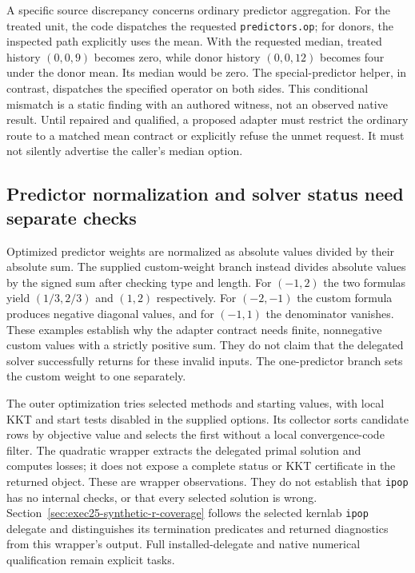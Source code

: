 A specific source discrepancy concerns ordinary predictor aggregation.
For the treated unit, the code dispatches the requested
\texttt{predictors.op}; for donors, the inspected path explicitly uses
the mean. With the requested median, treated history $(0,0,9)$ becomes
zero, while donor history $(0,0,12)$ becomes four under the donor mean.
Its median would be zero. The special-predictor helper, in contrast,
dispatches the specified operator on both sides. This conditional mismatch
is a static finding with an authored witness, not an observed native
result. Until repaired and qualified, a proposed adapter must restrict
the ordinary route to a matched mean contract or explicitly refuse the
unmet request. It must not silently advertise the caller's median option.
\citep{exec24_synth_source,exec24_synth_choice}

\subsection{Predictor normalization and solver status need separate checks}
Optimized predictor weights are normalized as absolute values divided by
their absolute sum. The supplied custom-weight branch instead divides
absolute values by the signed sum after checking type and length.
For $(-1,2)$ the two formulas yield $(1/3,2/3)$ and $(1,2)$ respectively.
For $(-2,-1)$ the custom formula produces negative diagonal values, and
for $(-1,1)$ the denominator vanishes. These examples establish why
the adapter contract needs finite, nonnegative custom values with a
strictly positive sum. They do not claim that the delegated solver
successfully returns for these invalid inputs. The one-predictor branch
sets the custom weight to one separately.
\citep{exec24_synth_source,exec24_synth_choice}

The outer optimization tries selected methods and starting values,
with local KKT and start tests disabled in the supplied options. Its
collector sorts candidate rows by objective value and selects the first
without a local convergence-code filter. The quadratic wrapper extracts
the delegated primal solution and computes losses; it does not expose a
complete status or KKT certificate in the returned object. These are
wrapper observations. They do not establish that \texttt{ipop} has no
internal checks, or that every selected solution is wrong.
Section~\ref{sec:exec25-synthetic-r-coverage} follows the selected kernlab
\texttt{ipop} delegate and distinguishes its termination predicates and
returned diagnostics from this wrapper's output. Full installed-delegate
and native numerical qualification remain explicit tasks.
\citep{exec24_synth_source}

